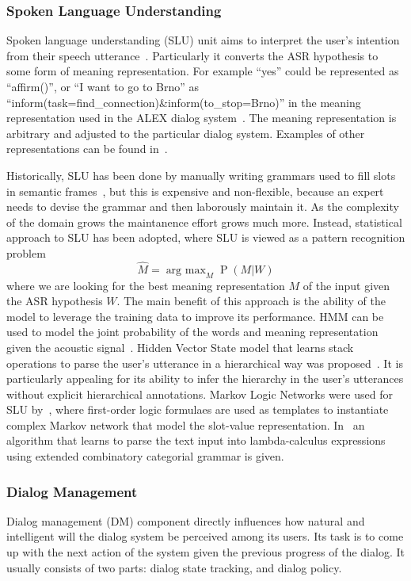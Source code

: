 \documentclass[runningheads,a4paper]{llncs}
\begin{document}
\subsubsection{Spoken Language Understanding}
Spoken language understanding (SLU) unit aims to interpret the user's intention from their speech utterance~\cite{wang2005spoken}. Particularly it converts the ASR hypothesis to some form of meaning representation. For example ``yes'' could be represented as ``affirm()'', or ``I want to go to Brno'' as ``inform(task=find\_connection)\&inform(to\_stop=Brno)'' in the meaning representation used in the ALEX dialog system~\cite{duvsek2014alex}. The meaning representation is arbitrary and adjusted to the particular dialog system. Examples of other representations can be found in~\cite{skantze2008galatea,he2003data}.

Historically, SLU has been done by manually writing grammars used to fill slots in semantic frames~\cite{ward1994recent,dowding1993gemini}, but this is expensive and non-flexible, because an expert needs to devise the grammar and then laborously maintain it. As the complexity of the domain grows the maintanence effort grows much more. Instead, statistical approach to SLU has been adopted, where SLU is viewed as a pattern recognition problem
$$\hat M=\operatorname{arg~max}_M \operatorname{P}(M|W)$$
where we are looking for the best meaning representation $M$ of the input given the ASR hypothesis $W$. The main benefit of this approach is the ability of the model to leverage the training data to improve its performance. HMM can be used to model the joint probability of the words and meaning representation given the acoustic signal~\cite{pieraccini1992progress,pieraccini1992stochastic}. Hidden Vector State model that learns stack operations to parse the user's utterance in a hierarchical way was proposed~\cite{he2003data}. It is particularly appealing for its ability to infer the hierarchy in the user's utterances without explicit hierarchical annotations. Markov Logic Networks were used for SLU by~\cite{meza2008spoken}, where first-order logic formulaes are used as templates to instantiate complex Markov network that model the slot-value representation. In~\cite{zettlemoyer2007online} an algorithm that learns to parse the text input into lambda-calculus expressions using extended combinatory categorial grammar is given.

\subsubsection{Dialog Management}
Dialog management (DM) component directly influences how natural and intelligent will the dialog system be perceived among its users. Its task is to come up with the next action of the system given the previous progress of the dialog. It usually consists of two parts: dialog state tracking, and dialog policy.
\end{document}
